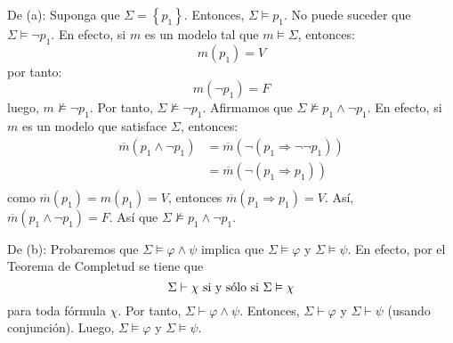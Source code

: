 \documentclass[12pt]{report}
\newcounter{it}
\theoremstyle{largebreak}
\begin{document}
    \begin{sol}
        De (a): Suponga que $\Sigma=\left\{p_1 \right\}$. Entonces, $\Sigma\vDash p_1$. No puede suceder que $\Sigma\vDash\neg p_1$. En efecto, si $m$ es un modelo tal que $m\vDash\Sigma$, entonces:
        \begin{equation*}
            m(p_1)=V
        \end{equation*}
        por tanto:
        \begin{equation*}
            m(\neg p_1)=F
        \end{equation*}
        luego, $m\nvDash\neg p_1$. Por tanto, $\Sigma\nvDash\neg p_1$. Afirmamos que $\Sigma\nvDash p_1\land\neg p_1$. En efecto, si $m$ es un modelo que satisface $\Sigma$, entonces:
        \begin{equation*}
            \begin{split}
                \overline{m}(p_1\land\neg p_1)&=\overline{m}(\neg(p_1\Rightarrow \neg\neg p_1))\\
                &=\overline{m}(\neg(p_1\Rightarrow p_1))\\
            \end{split}
        \end{equation*}
        como $\overline{m}(p_1)=m(p_1)=V$, entonces $\overline{m}(p_1\Rightarrow p_1)=V$. Así, $\overline{m}(p_1\land\neg p_1)=F$. Así que $\Sigma\nvDash p_1\land\neg p_1$.

        De (b): Probaremos que $\Sigma\vDash\varphi\land\psi$ implica que $\Sigma\vDash\varphi$ y $\Sigma\vDash\psi$. En efecto, por el Teorema de Completud se tiene que
        \begin{equation*}
            \Sigma\vdash\chi\textup{ si y sólo si }\Sigma\vDash\chi
        \end{equation*}
        para toda fórmula $\chi$. Por tanto, $\Sigma\vdash\varphi\land\psi$. Entonces, $\Sigma\vdash\varphi$ y $\Sigma\vdash\psi$ (usando conjunción). Luego, $\Sigma\vDash\varphi$ y $\Sigma\vDash\psi$.
    \end{sol}
\end{document}
